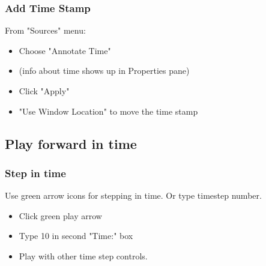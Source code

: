 \documentclass{beamer}
\begin{document}
\begin{frame}[fragile]\frametitle{Add Time Stamp}
From "Sources" menu:

\begin{itemize}
  \item Choose "Annotate Time"
  \item (info about time shows up in Properties pane)
  \item Click "Apply"
  \item "Use Window Location" to move the time stamp
\end{itemize}

\end{frame}

\subsection{Play forward in time}

\begin{frame}[fragile]\frametitle{Step in time}
Use green arrow icons for stepping in time. Or type timestep number.

\begin{itemize}
  \item Click green play arrow 
  \item Type 10 in second "Time:" box 
  \item Play with other time step controls.
\end{itemize}

\end{frame}

\end{document}
